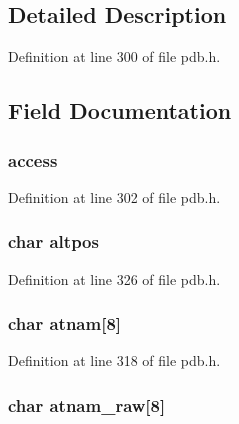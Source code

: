 \subsection{Detailed Description}


Definition at line 300 of file pdb.\-h.



\subsection{Field Documentation}
\hypertarget{structpdb__entry_a67301a56812fccd8b3aa6a172dd1e9d8}{
\subsubsection[{access}]{ access}}\label{structpdb__entry_a67301a56812fccd8b3aa6a172dd1e9d8}


Definition at line 302 of file pdb.\-h.

\hypertarget{structpdb__entry_aac30c1bea908a7bb889d5e09d60279e8}{
\subsubsection[{altpos}]{\setlength{\rightskip}{0pt plus 5cm}char altpos}}\label{structpdb__entry_aac30c1bea908a7bb889d5e09d60279e8}


Definition at line 326 of file pdb.\-h.

\hypertarget{structpdb__entry_a0982e141e36a2d4299d6555e0a1496cb}{
\subsubsection[{atnam}]{\setlength{\rightskip}{0pt plus 5cm}char atnam\mbox{[}8\mbox{]}}}\label{structpdb__entry_a0982e141e36a2d4299d6555e0a1496cb}


Definition at line 318 of file pdb.\-h.

\hypertarget{structpdb__entry_a2dd38672a2991bc568e105a24b3c936b}{
\subsubsection[{atnam\-\_\-raw}]{\setlength{\rightskip}{0pt plus 5cm}char atnam\-\_\-raw\mbox{[}8\mbox{]}}}\label{structpdb__entry_a2dd38672a2991bc568e105a24b3c936b}


